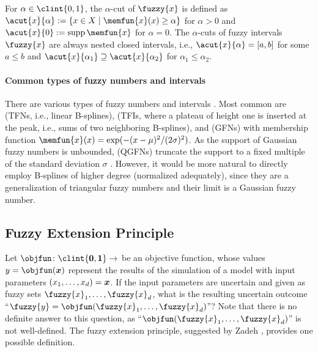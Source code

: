 For $\alpha \in \clint{0, 1}$, the $\alpha$-cut of $\fuzzy{x}$ is
defined as $\acut{x}{\alpha} := \{x \in X \mid \memfun{x}(x) \ge \alpha\}$
for $\alpha > 0$ and $\acut{x}{0} := \supp \memfun{x}$ for $\alpha = 0$.
The $\alpha$-cuts of fuzzy intervals $\fuzzy{x}$ are always
nested closed intervals, i.e.,
$\acut{x}{\alpha} = [a, b]$ for some $a \le b$ and
$\acut{x}{\alpha_1} \supset \acut{x}{\alpha_2}$ for $\alpha_1 \le \alpha_2$.

\paragraph{Common types of fuzzy numbers and intervals}

There are various types of fuzzy numbers and intervals
\cite{Klimke06Uncertainty}.
Most common are
 (TFNs, i.e., linear B-splines),
(TFIs, where a plateau of height one is inserted at the peak, i.e.,
sums of two neighboring B-splines), and
 (GFNs) with membership function
$\memfun{x}(x) = \exp(-(x - \mu)^2/(2\sigma)^2)$.
As the support of Gaussian fuzzy numbers is unbounded,
 (QGFNs) truncate the support
to a fixed multiple of the standard deviation $\sigma$
\cite{Klimke06Uncertainty}.
However, it would be more natural to directly employ B-splines of
higher degree (normalized adequately), since they are a generalization
of triangular fuzzy numbers and their limit is a Gaussian fuzzy number.



\subsection{Fuzzy Extension Principle}
\label{sec:552fuzzyExtensionPrinciple}

Let $\objfun\colon \clint{\*0, \*1} \to \real$ be an objective function,
whose values $y = \objfun(\*x)$ represent the results of the
simulation of a model with input parameters $(x_1, \dotsc, x_d) = {\boldsymbol{x}}$.
If the input parameters are uncertain and
given as fuzzy sets $\fuzzy{x}_1, \dotsc, \fuzzy{x}_d$,
what is the resulting uncertain outcome
``$\fuzzy{y} = \objfun(\fuzzy{x}_1, \dotsc, \fuzzy{x}_d)$''?
Note that there is no definite answer to this question,
as ``$\objfun(\fuzzy{x}_1, \dotsc, \fuzzy{x}_d)$'' is not well-defined.
The fuzzy extension principle, suggested by Zadeh \cite{Zadeh75Concept},
provides one possible definition.

